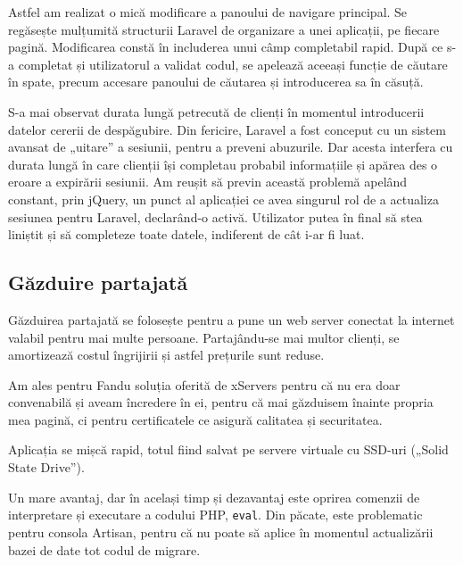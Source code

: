 	Astfel am realizat o mică modificare a panoului de navigare principal.
	Se regăsește mulțumită structurii Laravel de organizare a unei aplicații, pe fiecare pagină.
	Modificarea constă în includerea unui câmp completabil rapid.
	După ce s-a completat și utilizatorul a validat codul, se apelează aceeași funcție de căutare în spate, precum accesare panoului de căutarea și introducerea sa în căsuță.

	S-a mai observat durata lungă petrecută de clienți în momentul introducerii datelor cererii de despăgubire.
	Din fericire, Laravel a fost conceput cu un sistem avansat de „uitare” a sesiunii, pentru a preveni abuzurile.
	Dar acesta interfera cu durata lungă în care clienții își completau probabil informațiile și apărea des o eroare a expirării sesiunii.
	Am reușit să previn această problemă apelând constant, prin jQuery, un punct al aplicației ce avea singurul rol de a actualiza sesiunea pentru Laravel, declarând-o activă.
	Utilizator putea în final să stea liniștit și să completeze toate datele, indiferent de cât i-ar fi luat.

	\subsection{Găzduire partajată}

		Găzduirea partajată se folosește pentru a pune un web server conectat la internet valabil pentru mai multe persoane.
		Partajându-se mai multor clienți, se amortizează costul îngrijirii și astfel prețurile sunt reduse.

		Am ales pentru Fandu soluția oferită de xServers\cite{xservers} pentru că nu era doar convenabilă și aveam încredere în ei, pentru că mai găzduisem înainte propria mea pagină, ci pentru certificatele ce asigură calitatea și securitatea.

		Aplicația se mișcă rapid, totul fiind salvat pe servere virtuale cu SSD-uri („Solid State Drive”).

		Un mare avantaj, dar în același timp și dezavantaj este oprirea comenzii de interpretare și executare a codului PHP, \verb|eval|.
		Din păcate, este problematic pentru consola Artisan, pentru că nu poate să aplice în momentul actualizării bazei de date tot codul de migrare.

